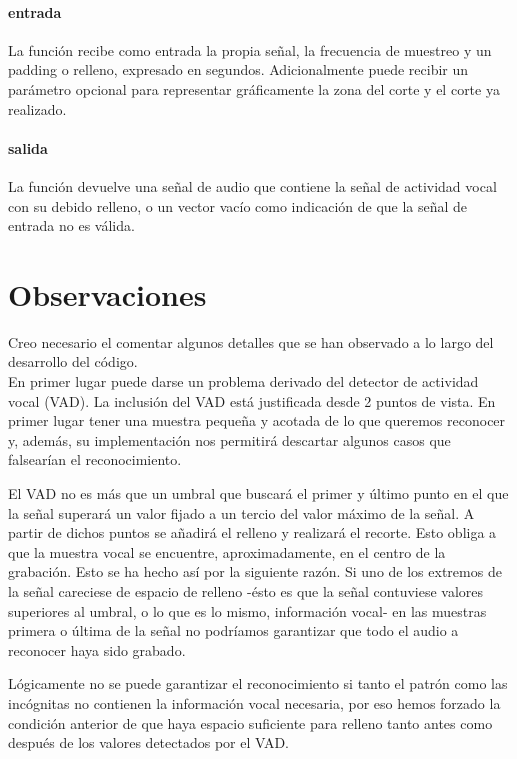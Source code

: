\documentclass[10pt, a4paper]{article}
\begin{document}
\paragraph{entrada} La función recibe como entrada la propia señal, la frecuencia de muestreo y un padding o relleno, expresado en segundos. Adicionalmente puede recibir un parámetro opcional para representar gráficamente la zona del corte y el corte ya realizado.

\paragraph{salida} La función devuelve una señal de audio que contiene la señal de actividad vocal con su debido relleno, o un vector vacío como indicación de que la señal de entrada no es válida.


\section{Observaciones}
Creo necesario el comentar algunos detalles que se han observado a lo largo del desarrollo del código.\\

En primer lugar puede darse un problema derivado del detector de actividad vocal (VAD). La inclusión del VAD está justificada desde 2 puntos de vista. En primer lugar tener una muestra pequeña y acotada de lo que queremos reconocer y, además, su implementación nos permitirá descartar algunos casos que falsearían el reconocimiento.

El VAD no es más que un umbral que buscará el primer y último punto en el que la señal superará un valor fijado a un tercio del valor máximo de la señal. A partir de dichos puntos se añadirá el relleno y realizará el recorte. Esto obliga a que la muestra vocal se encuentre, aproximadamente, en el centro de la grabación. Esto se ha hecho así por la siguiente razón. Si uno de los extremos de la señal careciese de espacio de relleno -ésto es que la señal contuviese valores superiores al umbral, o lo que es lo mismo, información vocal- en las muestras primera o última de la señal no podríamos garantizar que todo el audio a reconocer haya sido grabado.

Lógicamente no se puede garantizar el reconocimiento si tanto el patrón como las incógnitas no contienen la información vocal necesaria, por eso hemos forzado la condición anterior de que haya espacio suficiente para relleno tanto antes como después de los valores detectados por el VAD.\\
\end{document}
